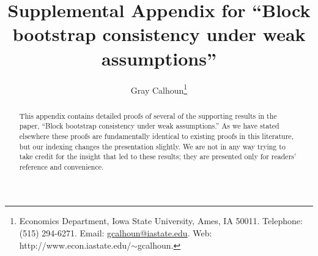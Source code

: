 \documentclass[11pt]{article}
\begin{document}
\author{Gray Calhoun\thanks{Economics Department, Iowa State
    University, Ames, IA 50011. Telephone: (515) 294-6271.  Email:
    \protect\url{gcalhoun@iastate.edu}. Web:
    http://www.econ.iastate.edu/$\sim$gcalhoun.}}

\title{Supplemental Appendix for ``Block bootstrap consistency under
  weak assumptions''}

\maketitle

\begin{abstract}
  \noindent This appendix contains detailed proofs of several of the
  supporting results in the paper, ``Block bootstrap consistency under
  weak assumptions.'' As we have stated elsewhere these proofs are
  fundamentally identical to existing proofs in this literature, but
  our indexing changes the presentation slightly. We are not in any
  way trying to take credit for the insight that led to these results;
  they are presented only for readers' reference and convenience.
\end{abstract}
\end{document}
